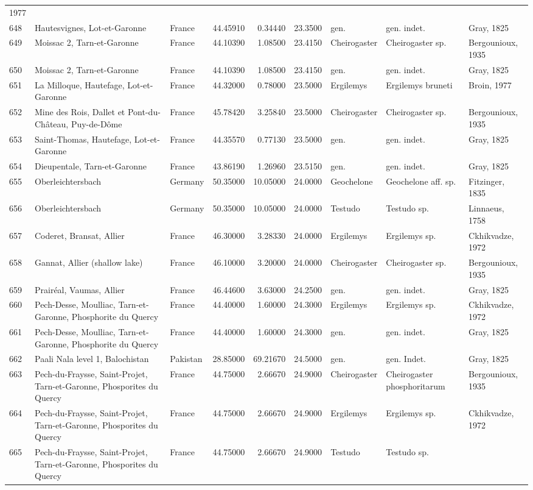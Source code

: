 \documentclass[]{article}
\begin{document}
\begin{longtable}[]{@{}lllrrrlll@{}}
1977\tabularnewline
648 & Hautesvignes, Lot-et-Garonne & France & 44.45910 & 0.34440 &
23.3500 & gen. & gen. indet. & Gray, 1825\tabularnewline
649 & Moissac 2, Tarn-et-Garonne & France & 44.10390 & 1.08500 & 23.4150
& Cheirogaster & Cheirogaster sp. & Bergounioux, 1935\tabularnewline
650 & Moissac 2, Tarn-et-Garonne & France & 44.10390 & 1.08500 & 23.4150
& gen. & gen. indet. & Gray, 1825\tabularnewline
651 & La Milloque, Hautefage, Lot-et-Garonne & France & 44.32000 &
0.78000 & 23.5000 & Ergilemys & Ergilemys bruneti & Broin,
1977\tabularnewline
652 & Mine des Rois, Dallet et Pont-du-Château, Puy-de-Dôme & France &
45.78420 & 3.25840 & 23.5000 & Cheirogaster & Cheirogaster sp. &
Bergounioux, 1935\tabularnewline
653 & Saint-Thomas, Hautefage, Lot-et-Garonne & France & 44.35570 &
0.77130 & 23.5000 & gen. & gen. indet. & Gray, 1825\tabularnewline
654 & Dieupentale, Tarn-et-Garonne & France & 43.86190 & 1.26960 &
23.5150 & gen. & gen. indet. & Gray, 1825\tabularnewline
655 & Oberleichtersbach & Germany & 50.35000 & 10.05000 & 24.0000 &
Geochelone & Geochelone aff. sp. & Fitzinger, 1835\tabularnewline
656 & Oberleichtersbach & Germany & 50.35000 & 10.05000 & 24.0000 &
Testudo & Testudo sp. & Linnaeus, 1758\tabularnewline
657 & Coderet, Bransat, Allier & France & 46.30000 & 3.28330 & 24.0000 &
Ergilemys & Ergilemys sp. & Ckhikvadze, 1972\tabularnewline
658 & Gannat, Allier (shallow lake) & France & 46.10000 & 3.20000 &
24.0000 & Cheirogaster & Cheirogaster sp. & Bergounioux,
1935\tabularnewline
659 & Prairéal, Vaumas, Allier & France & 46.44600 & 3.63000 & 24.2500 &
gen. & gen. indet. & Gray, 1825\tabularnewline
660 & Pech-Desse, Moulliac, Tarn-et-Garonne, Phosphorite du Quercy &
France & 44.40000 & 1.60000 & 24.3000 & Ergilemys & Ergilemys sp. &
Ckhikvadze, 1972\tabularnewline
661 & Pech-Desse, Moulliac, Tarn-et-Garonne, Phosphorite du Quercy &
France & 44.40000 & 1.60000 & 24.3000 & gen. & gen. indet. & Gray,
1825\tabularnewline
662 & Paali Nala level 1, Balochistan & Pakistan & 28.85000 & 69.21670 &
24.5000 & gen. & gen. Indet. & Gray, 1825\tabularnewline
663 & Pech-du-Fraysse, Saint-Projet, Tarn-et-Garonne, Phosporites du
Quercy & France & 44.75000 & 2.66670 & 24.9000 & Cheirogaster &
Cheirogaster phosphoritarum & Bergounioux, 1935\tabularnewline
664 & Pech-du-Fraysse, Saint-Projet, Tarn-et-Garonne, Phosporites du
Quercy & France & 44.75000 & 2.66670 & 24.9000 & Ergilemys & Ergilemys
sp. & Ckhikvadze, 1972\tabularnewline
665 & Pech-du-Fraysse, Saint-Projet, Tarn-et-Garonne, Phosporites du
Quercy & France & 44.75000 & 2.66670 & 24.9000 & Testudo & Testudo sp. &

\end{longtable}
\end{document}
